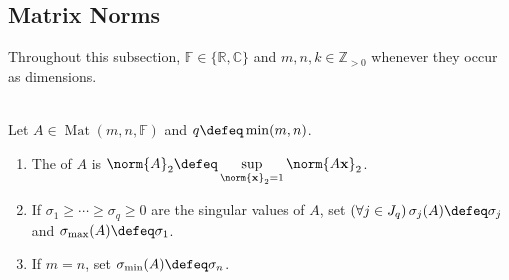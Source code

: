 \subsection{Matrix Norms}

Throughout this subsection, $\mathbb{F}\in\{\mathbb{R},\mathbb{C}\}$ and $m,n,k\in\mathbb{Z}_{>0}$ whenever they occur as dimensions.

\begin{definition} \label{def:spectral-norm-and-singular-extremes} \\
Let $A\in\operatorname{Mat}(m,n,\mathbb{F})$ and $q\defeq\min(m,n)$.
\begin{enumerate}[label=(\roman*)]
\setlength{\itemsep}{0pt}
\item The  of $A$ is $\norm{A}_2\defeq\sup\limits_{\norm{\mathbf{x}}_2=1}\norm{A\mathbf{x}}_2$.
\item If $\sigma_1\geq\cdots\geq\sigma_q\geq0$ are the singular values of $A$, set $(\forall j\in J_q)\,\sigma_j(A)\defeq\sigma_j$ and $\sigma_{\max}(A)\defeq\sigma_1$.
\item If $m=n$, set $\sigma_{\min}(A)\defeq\sigma_n$.
\end{enumerate}
\end{definition}

